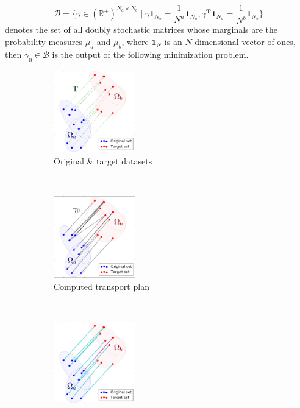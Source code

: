 \begin{equation}
{\mathcal{B} = \big\{ \gamma \in (\mathbb{R}^+)^{N_a\times N_b} \mid \gamma \mathbf{1}_{N_b} = \frac{1}{N^a}\mathbf{1}_{N_a}, \gamma^{\mathbf{T}} \mathbf{1}_{N_a} = \frac{1}{N^b}\mathbf{1}_{N_b}  \big\}}
\end{equation}
denotes the set of all doubly stochastic matrices whose marginals are the probability measures $\mu_a$ and $\mu_b$, where $\mathbf{1}_N$ is an $N$-dimensional vector of ones, then $\gamma_0 \in \mathcal{B}$ is the output of the following minimization problem.

\begin{figure}[t!]
    \centering
    \begin{subfigure}[t]{0.32\textwidth}
        \centering
        \includegraphics[height=1.4in]{3.matching/images/one}
        \caption{{\scriptsize Original \& target datasets}}
        \label{fig:otprob_a}
    \end{subfigure}%
    ~ 
    \begin{subfigure}[t]{0.32\textwidth}
        \centering
        \includegraphics[height=1.4in]{3.matching/images/two}
        \caption{{\scriptsize Computed transport plan}}
        \label{fig:otprob_b}
    \end{subfigure}
    ~
    \begin{subfigure}[t]{0.32\textwidth}
        \centering
        \includegraphics[height=1.4in]{3.matching/images/three}

\end{subfigure}
\end{figure}
